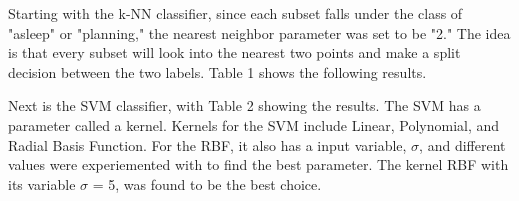 \documentclass[conference,compsoc]{IEEEtran}
\begin{document}
Starting with the k-NN classifier, since each subset falls under the class of "asleep" or "planning," the nearest neighbor parameter 
was set to be "2." The idea is that every subset will look into the nearest two points and make a split decision between the two labels. 
Table 1 shows the following results.
\begin{table*}[h]
	\noindent{}
	\caption{Accuracies for k-NN Classifier}
	\label{table1}
\end{table*}

Next is the SVM classifier, with Table 2 showing the results. The SVM has a parameter called a kernel. Kernels for the SVM include Linear, Polynomial, and Radial Basis Function. 
For the RBF, it also has a input variable,  $\sigma$, and different values were experiemented with to find the best parameter. The kernel RBF with its 
variable $\sigma$ = 5, was found to be the best choice.
\begin{table*}[h]
	\noindent{}
	\caption{Accuracies for SVM Classifier}
	\label{table2}
\end{table*}
\end{document}
